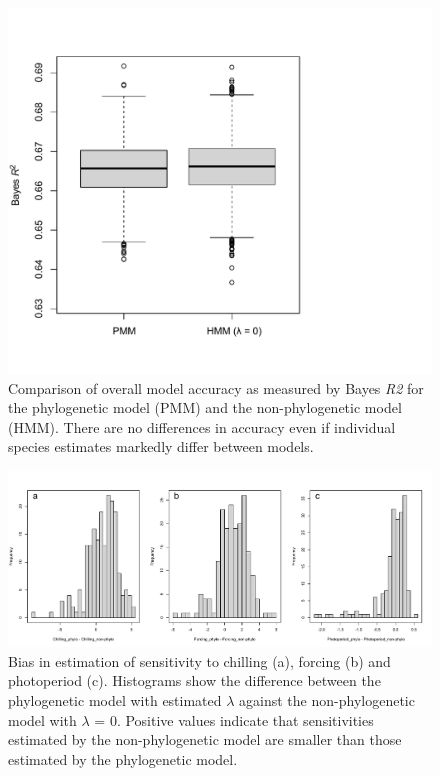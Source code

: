 \documentclass[11pt]{article}
\begin{document}
\clearpage
\begin{figure}
  \begin{center}
  \includegraphics[width=16cm]{../../analyses/phylogeny/figures/Boxplot_bayesR2.pdf}
  \caption{Comparison of overall model accuracy as measured by Bayes \emph{R2} for the phylogenetic model (PMM) and the non-phylogenetic model (HMM). There are no differences in accuracy even if individual species estimates markedly differ between models.}
  \label{fig:accuracycomp}
  \end{center}
\end{figure}

\clearpage
\begin{figure}
  \begin{center}
  \includegraphics[width=14cm]{../../analyses/phylogeny/figures/FigSXX_bias_sens_phylo_nonphylo.pdf}
  \caption{Bias in estimation of sensitivity to chilling (a), forcing (b) and photoperiod (c). Histograms show the difference between the phylogenetic model with estimated $\lambda$ against the non-phylogenetic model with $\lambda$ = 0. Positive values indicate that sensitivities estimated by the non-phylogenetic model are smaller than those estimated by the phylogenetic model.}
  \label{fig:biasestimation}
  \end{center}
\end{figure}
\end{document}
